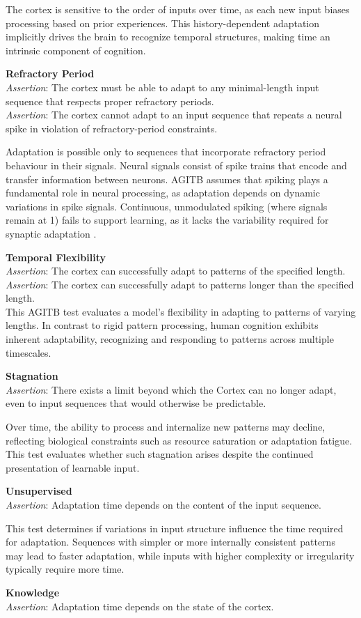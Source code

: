 \documentclass{article}
\newcommand{\agitbtest}[2]{
 \item \textbf{#1} \\
 #2
}
\begin{document}
\begin{agitblist}
{The cortex is sensitive to the order of inputs over time, as each new input biases processing based on prior experiences. This history-dependent adaptation implicitly drives the brain to recognize temporal structures, making time an intrinsic component of cognition.
}
\agitbtest{Refractory Period}{
\emph{Assertion}: The cortex must be able to adapt to any minimal-length input sequence that respects proper refractory periods.\\
\emph{Assertion}: The cortex cannot adapt to an input sequence that repeats a neural spike in violation of refractory-period constraints.

Adaptation is possible only to sequences that incorporate refractory period behaviour in their signals. Neural signals consist of spike trains that encode and transfer information between neurons. AGITB assumes that spiking plays a fundamental role in neural processing, as adaptation depends on dynamic variations in spike signals. Continuous, unmodulated spiking (where signals remain at 1) fails to support learning, as it lacks the variability required for synaptic adaptation \cite{Gerstner2002}. 
}
\agitbtest{Temporal Flexibility}{
\emph{Assertion}: The cortex can successfully adapt to patterns of the specified length.\\
\emph{Assertion}: The cortex can successfully adapt to patterns longer than the specified length.\\

This AGITB test evaluates a model’s flexibility in adapting to patterns of varying lengths. In contrast to rigid pattern processing, human cognition exhibits inherent adaptability, recognizing and responding to patterns across multiple timescales.
}
\agitbtest{Stagnation}{
\emph{Assertion}: There exists a limit beyond which the Cortex can no longer adapt, even to input sequences that would otherwise be predictable.

Over time, the ability to process and internalize new patterns may decline, reflecting biological constraints such as resource saturation or adaptation fatigue. This test evaluates whether such stagnation arises despite the continued presentation of learnable input.
}
\agitbtest{Unsupervised}{
\emph{Assertion}: Adaptation time depends on the content of the input sequence.

This test determines if variations in input structure influence the time required for adaptation. Sequences with simpler or more internally consistent patterns may lead to faster adaptation, while inputs with higher complexity or irregularity typically require more time. 
}
\agitbtest{Knowledge}{
\emph{Assertion}: Adaptation time depends on the state of the cortex.

}
\end{agitblist}
\end{document}
